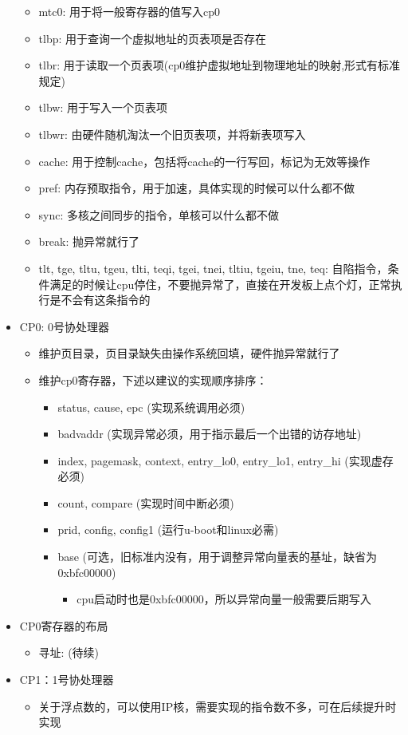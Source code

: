 \documentclass[lang=cn,11pt,a4paper]{elegantpaper}
\begin{document}
\begin{itemize}
\begin{itemize}
  \item mtc0: 用于将一般寄存器的值写入cp0
  \item tlbp: 用于查询一个虚拟地址的页表项是否存在
  \item tlbr: 用于读取一个页表项(cp0维护虚拟地址到物理地址的映射,形式有标准规定)
  \item tlbw: 用于写入一个页表项
  \item tlbwr: 由硬件随机淘汰一个旧页表项，并将新表项写入
  \item cache: 用于控制cache，包括将cache的一行写回，标记为无效等操作
  \item pref: 内存预取指令，用于加速，具体实现的时候可以什么都不做
  \item sync: 多核之间同步的指令，单核可以什么都不做
  \item break: 抛异常就行了
  \item tlt, tge, tltu, tgeu, tlti, teqi, tgei, tnei, tltiu, tgeiu, tne, teq: 自陷指令，条件满足的时候让cpu停住，不要抛异常了，直接在开发板上点个灯，正常执行是不会有这条指令的
  \end{itemize}
\item CP0: 0号协处理器
  \begin{itemize}
  \item 维护页目录，页目录缺失由操作系统回填，硬件抛异常就行了
  \item 维护cp0寄存器，下述以建议的实现顺序排序：
    \begin{itemize}
    \item status, cause, epc (实现系统调用必须)
	\item badvaddr (实现异常必须，用于指示最后一个出错的访存地址)
	\item index, pagemask, context, entry\_lo0, entry\_lo1, entry\_hi (实现虚存必须)
	\item count, compare (实现时间中断必须)
	\item prid, config, config1 (运行u-boot和linux必需)
	\item base (可选，旧标准内没有，用于调整异常向量表的基址，缺省为0xbfc00000)
      \begin{itemize}
	  \item cpu启动时也是0xbfc00000，所以异常向量一般需要后期写入
      \end{itemize}
    \end{itemize}
  \end{itemize}
\item CP0寄存器的布局
  \begin{itemize}
  \item 寻址: (待续)
  \end{itemize}
\item CP1：1号协处理器
  \begin{itemize}
  \item 关于浮点数的，可以使用IP核，需要实现的指令数不多，可在后续提升时实现
  \end{itemize}
\end{itemize}
\end{document}
